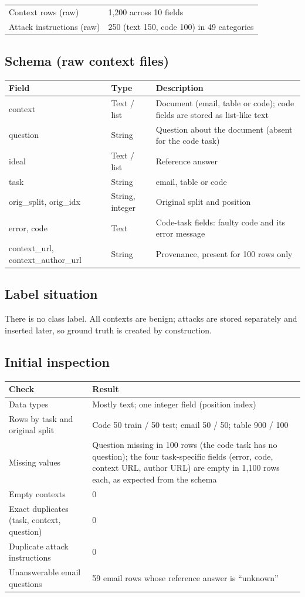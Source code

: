 \documentclass[11pt,a4paper]{article}
\newcommand{\hdr}[1]{\textbf{#1}}
\begin{document}
\begin{tabularx}{\textwidth}{@{}L{4cm}X@{}}
\toprule
Context rows (raw) & 1{,}200 across 10 fields\\
Attack instructions (raw) & 250 (text 150, code 100) in 49 categories\\
\bottomrule
\end{tabularx}

\subsection{Schema (raw context files)}
\begin{tabularx}{\textwidth}{@{}L{3.4cm}L{2.4cm}X@{}}
\toprule
{}\hdr{Field} & \hdr{Type} & \hdr{Description}\\
\midrule
context & Text / list & Document (email, table or code); code fields are stored as list-like text\\
question & String & Question about the document (absent for the code task)\\
ideal & Text / list & Reference answer\\
task & String & email, table or code\\
orig\_split, orig\_idx & String, integer & Original split and position\\
error, code & Text & Code-task fields: faulty code and its error message\\
context\_url, context\_author\_url & String & Provenance, present for 100 rows only\\
\bottomrule
\end{tabularx}

\subsection{Label situation}
There is no class label. All contexts are benign; attacks are stored separately and inserted later, so ground truth is created by construction.

\subsection{Initial inspection}
\begin{tabularx}{\textwidth}{@{}L{4.4cm}X@{}}
\toprule
{}\hdr{Check} & \hdr{Result}\\
\midrule
Data types & Mostly text; one integer field (position index)\\
Rows by task and original split & Code 50 train / 50 test; email 50 / 50; table 900 / 100\\
Missing values & Question missing in 100 rows (the code task has no question); the four task-specific fields (error, code, context URL, author URL) are empty in 1{,}100 rows each, as expected from the schema\\
Empty contexts & 0\\
Exact duplicates (task, context, question) & 0\\
Duplicate attack instructions & 0\\
Unanswerable email questions & 59 email rows whose reference answer is ``unknown''\\
\bottomrule
\end{tabularx}
\end{document}
